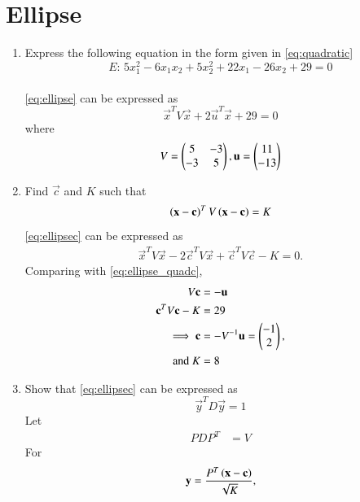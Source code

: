 \documentclass[journal,12pt,twocolumn]{IEEEtran}
\renewcommand\thesection{\arabic{section}}
\begin{document}
\section{Ellipse}
\begin{enumerate}[label=\thesection.\arabic*
,ref=\thesection.\theenumi]
\item Express the following equation in the form given in \eqref{eq:quadratic}
\begin{equation}
E:\, 5x_1^2-6x_1x_2 + 5x_2^2+22x_1-26x_2+29=0
\label{eq:ellipse}
\end{equation}
\\
\solution \eqref{eq:ellipse} can be expressed as
\begin{equation}
\vec{x}^TV\vec{x} + 2\vec{u}^T\vec{x}  + 29=0
\label{eq:ellipse_quadc}
\end{equation}
%
where
\begin{equation}
V = \begin{pmatrix}5 & -3 \\ -3 & 5\end{pmatrix}, \mathbf{u} = \begin{pmatrix}11 \\ -13\end{pmatrix}
\label{eq:ellipsevu}
\end{equation}
\item Find $\vec{c}$ and $K$ such that 
\begin{equation}
\left(\mathbf{x}-\mathbf{c}\right)^TV\left(\mathbf{x}-\mathbf{c}\right) = K 
\label{eq:ellipsec}
\end{equation}
%
\solution \eqref{eq:ellipsec} can be expressed as
\begin{align}
\vec{x}^TV\vec{x}-2\vec{c}^TV\vec{x} +\vec{c}^TV\vec{c}-K = 0.
\end{align}
%
Comparing with \eqref{eq:ellipse_quadc},
\begin{align}
V\mathbf{c}&=-\mathbf{u}
\\
\mathbf{c}^TV\mathbf{c} - K &=29
\\
\implies \mathbf{c} &=-V^{-1}\mathbf{u} = \begin{pmatrix}-1 \\ 2\end{pmatrix},
\\
\text{and }K& = 8
\end{align}
%
\item Show that \eqref{eq:ellipsec} can be expressed as
\begin{equation}
\vec{y}^TD\vec{y}= 1
\label{eq:ellipseo}
\end{equation}
%
\solution Let 
\begin{align}
PDP^T&= V
\label{eq:ellipse_sd}
\end{align}
For 
\begin{align}
\vec{y}= \frac{P^T\brak{\vec{x}-\vec{c}}}{\sqrt{K}},
\label{eq:ellipse_xy}

\end{align}
\end{enumerate}
\end{document}
